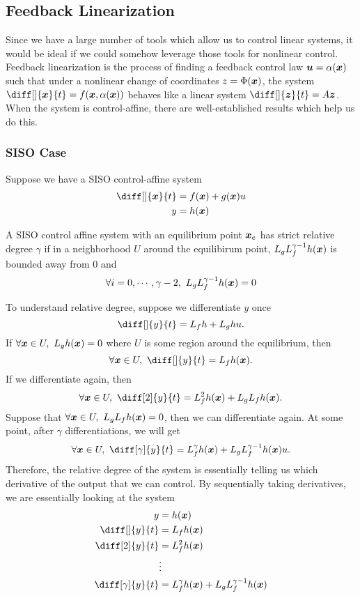\subsection{Feedback Linearization}
Since we have a large number of tools which allow us to control linear systems,
it would be ideal if we could somehow leverage those tools for nonlinear
control. Feedback linearization is the process of finding a feedback control law $\boldsymbol{u} =
\alpha(\boldsymbol{x})$ such that under a nonlinear change of coordinates $z =
\Phi(\boldsymbol{x})$, the system $\diff[]{\bs{x}}{t} = f(\bs{x}, \alpha(\bs{x}))$ behaves like a linear
system $\diff[]{\bs{z}}{t} = A\bs{z}$. When the system is control-affine, there
are well-established results which help us do this.

\subsubsection{SISO Case}
Suppose we have a SISO control-affine system \[
	\begin{aligned}
		\diff[]{\bs{x}}{t} &= f(\bs{x}) + g(\bs{x})u\\
		y &= h(\bs{x})
	\end{aligned}
\]
\begin{definition}
	A SISO control affine system with an equilibrium point $\boldsymbol{x}_e$ has
	strict relative degree $\gamma$ if in a neighborhood $U$ around the
	equilibirum point, $L_gL_f^{\gamma-1}h(\boldsymbol{x})$ is bounded away from 0 and \[
		\forall i=0,\cdots,\gamma-2,\ L_gL_f^{\gamma - 1}h(\bs{x}) = 0
	\]
	\label{defn:strict-relative-degree}
\end{definition}
To understand relative degree, suppose we differentiate $y$ once \[
	\diff[]{y}{t} = L_fh + L_gh u.
\]
If $\forall \bs{x}\in U,\ L_gh(\bs{x}) = 0$ where $U$ is some region around the
equilibrium, then \[
	\forall \bs{x}\in U,\ \diff[]{y}{t} = L_fh(\bs{x}).
\]
If we differentiate again, then \[
	\forall \bs{x}\in U,\ \diff[2]{y}{t} = L_f^2h(\bs{x}) + L_gL_fh(\bs{x}).
\]
Suppose that $\forall \boldsymbol{x}\in U,\ L_gL_fh(\boldsymbol{x}) = 0$, then we can
differentiate again. At some point, after $\gamma$ differentiations, we will
get \[
	\forall \bs{x}\in U,\ \diff[\gamma]{y}{t} = L_f^\gamma h(\bs{x}) +
	L_gL_f^{\gamma-1}h(\bs{x})u.
\]
Therefore, the relative degree of the system is essentially telling us which
derivative of the output that we can control. By sequentially taking
derivatives, we are essentially looking at the system \[
	\begin{aligned}
		y &= h(\bs{x})\\
		\diff[]{y}{t} &= L_fh(\bs{x})\\
		\diff[2]{y}{t} &= L_f^2h(\bs{x})\\
		&\vdots\\
		\diff[\gamma]{y}{t} &= L_f^\gamma h(\bs{x}) + L_gL_f^{\gamma-1}h(\bs{x})
	\end{aligned}
\]
